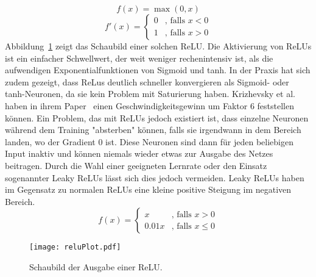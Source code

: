 \begin{equation}
	f(x) = \max(0, x)
\end{equation}
\begin{equation*}
	f'(x) = \begin{cases}
	0 &\text{, falls $x < 0$}\\
	1 &\text{, falls $x > 0$}
	\end{cases}
\end{equation*}
	Abbildung~\ref{reluoutput} zeigt das Schaubild einer solchen ReLU. 
	Die Aktivierung von ReLUs ist ein einfacher Schwellwert, der weit weniger rechenintensiv ist, als die aufwendigen Exponentialfunktionen von Sigmoid und tanh.
	In der Praxis hat sich zudem gezeigt, dass ReLus deutlich schneller konvergieren als Sigmoid- oder tanh-Neuronen, da sie kein Problem mit Saturierung haben.
	Krizhevsky et al. haben in ihrem Paper~\cite{NIPS2012_4824} einen Geschwindigkeitsgewinn um Faktor 6 feststellen können.
	Ein Problem, das mit ReLUs jedoch existiert ist, dass einzelne Neuronen während dem Training "absterben" können, falls sie irgendwann in dem Bereich landen, wo der Gradient 0 ist.
	Diese Neuronen sind dann für jeden beliebigen Input inaktiv und können niemals wieder etwas zur Ausgabe des Netzes beitragen.
	Durch die Wahl einer geeigneten Lernrate oder den Einsatz sogenannter Leaky ReLUs lässt sich dies jedoch vermeiden.
	Leaky ReLUs haben im Gegensatz zu normalen ReLUs eine kleine positive Steigung im negativen Bereich.
	\begin{equation}
		f(x) = \begin{cases}
			x &\text{, falls } x  >  0\\
			0.01 x &\text{, falls } x  \leq  0
		\end{cases}
	\end{equation} 
	

	\begin{figure}[h]
		\centering
		\texttt{[image: reluPlot.pdf]}
		\caption{Schaubild der Ausgabe einer ReLU.}
		\label{reluoutput}
	\end{figure}




